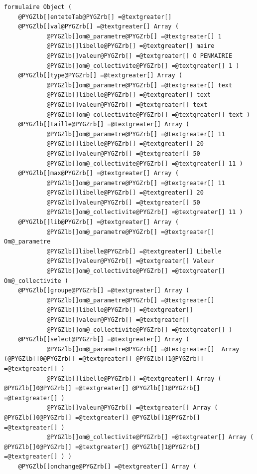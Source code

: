 \documentclass[letterpaper,10pt,french]{manual}
\begin{document}
\begin{Verbatim}[commandchars=@\[\]]
formulaire Object (
    @PYGZlb[]enteteTab@PYGZrb[] =@textgreater[]
    @PYGZlb[]val@PYGZrb[] =@textgreater[] Array (
            @PYGZlb[]om@_parametre@PYGZrb[] =@textgreater[] 1
            @PYGZlb[]libelle@PYGZrb[] =@textgreater[] maire
            @PYGZlb[]valeur@PYGZrb[] =@textgreater[] O PENMAIRIE
            @PYGZlb[]om@_collectivite@PYGZrb[] =@textgreater[] 1 )
    @PYGZlb[]type@PYGZrb[] =@textgreater[] Array (
            @PYGZlb[]om@_parametre@PYGZrb[] =@textgreater[] text
            @PYGZlb[]libelle@PYGZrb[] =@textgreater[] text
            @PYGZlb[]valeur@PYGZrb[] =@textgreater[] text
            @PYGZlb[]om@_collectivite@PYGZrb[] =@textgreater[] text )
    @PYGZlb[]taille@PYGZrb[] =@textgreater[] Array (
            @PYGZlb[]om@_parametre@PYGZrb[] =@textgreater[] 11
            @PYGZlb[]libelle@PYGZrb[] =@textgreater[] 20
            @PYGZlb[]valeur@PYGZrb[] =@textgreater[] 50
            @PYGZlb[]om@_collectivite@PYGZrb[] =@textgreater[] 11 )
    @PYGZlb[]max@PYGZrb[] =@textgreater[] Array (
            @PYGZlb[]om@_parametre@PYGZrb[] =@textgreater[] 11
            @PYGZlb[]libelle@PYGZrb[] =@textgreater[] 20
            @PYGZlb[]valeur@PYGZrb[] =@textgreater[] 50
            @PYGZlb[]om@_collectivite@PYGZrb[] =@textgreater[] 11 )
    @PYGZlb[]lib@PYGZrb[] =@textgreater[] Array (
            @PYGZlb[]om@_parametre@PYGZrb[] =@textgreater[] Om@_parametre
            @PYGZlb[]libelle@PYGZrb[] =@textgreater[] Libelle
            @PYGZlb[]valeur@PYGZrb[] =@textgreater[] Valeur
            @PYGZlb[]om@_collectivite@PYGZrb[] =@textgreater[] Om@_collectivite )
    @PYGZlb[]groupe@PYGZrb[] =@textgreater[] Array (
            @PYGZlb[]om@_parametre@PYGZrb[] =@textgreater[]
            @PYGZlb[]libelle@PYGZrb[] =@textgreater[]
            @PYGZlb[]valeur@PYGZrb[] =@textgreater[]
            @PYGZlb[]om@_collectivite@PYGZrb[] =@textgreater[] )
    @PYGZlb[]select@PYGZrb[] =@textgreater[] Array (
            @PYGZlb[]om@_parametre@PYGZrb[] =@textgreater[]  Array (@PYGZlb[]0@PYGZrb[] =@textgreater[] @PYGZlb[]1@PYGZrb[] =@textgreater[] )
            @PYGZlb[]libelle@PYGZrb[] =@textgreater[] Array ( @PYGZlb[]0@PYGZrb[] =@textgreater[] @PYGZlb[]1@PYGZrb[] =@textgreater[] )
            @PYGZlb[]valeur@PYGZrb[] =@textgreater[] Array ( @PYGZlb[]0@PYGZrb[] =@textgreater[] @PYGZlb[]1@PYGZrb[] =@textgreater[] )
            @PYGZlb[]om@_collectivite@PYGZrb[] =@textgreater[] Array ( @PYGZlb[]0@PYGZrb[] =@textgreater[] @PYGZlb[]1@PYGZrb[] =@textgreater[] ) )
    @PYGZlb[]onchange@PYGZrb[] =@textgreater[] Array (

\end{Verbatim}
\end{document}

